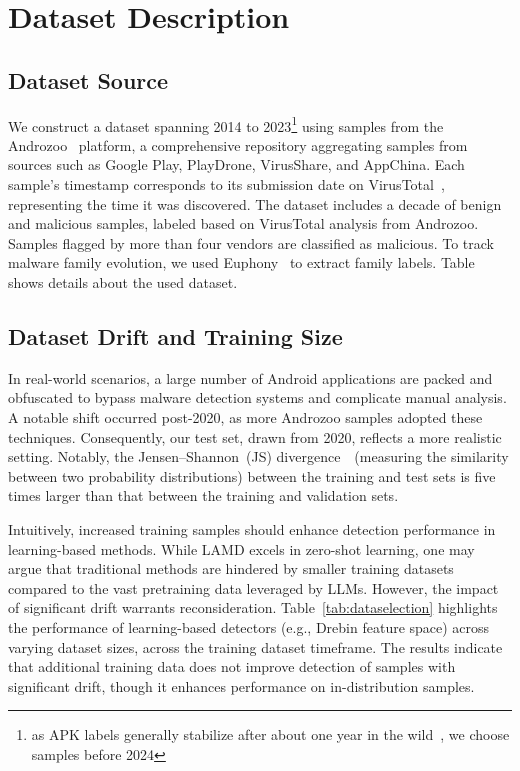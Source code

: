 \section{Dataset Description}
\label{app:dataset}
\subsection{Dataset Source}
\noindent We construct a dataset spanning 2014 to 2023\footnote{as APK labels generally stabilize after about one year in the wild~\cite{labelstability}, we choose samples before 2024} using samples from the Androzoo~\cite{AndroZoo} platform, a comprehensive repository aggregating samples from sources such as Google Play, PlayDrone, VirusShare, and AppChina. Each sample's timestamp corresponds to its submission date on VirusTotal~\cite{VirusTotal}, representing the time it was discovered. The dataset includes a decade of benign and malicious samples, labeled based on VirusTotal analysis from Androzoo. Samples flagged by more than four vendors are classified as malicious. To track malware family evolution, we used Euphony~\cite{euphony} to extract family labels. Table shows details about the used dataset.





\subsection{Dataset Drift and Training Size}
In real-world scenarios, a large number of Android applications are packed and obfuscated to bypass malware detection systems and complicate manual analysis. A notable shift occurred post-2020, as more Androzoo samples adopted these techniques. Consequently, our test set, drawn from 2020, reflects a more realistic setting. 
Notably, the Jensen–Shannon~(JS) divergence~\cite{menendez1997jensen}~(measuring the similarity between two probability distributions) between the training and test sets is five times larger than that between the training and validation sets.

Intuitively, increased training samples should enhance detection performance in learning-based methods. While LAMD excels in zero-shot learning, one may argue that traditional methods are hindered by smaller training datasets compared to the vast pretraining data leveraged by LLMs. However, the impact of significant drift warrants reconsideration. Table~\ref{tab:dataselection} highlights the performance of learning-based detectors (e.g., Drebin feature space) across varying dataset sizes, across the training dataset timeframe.
The results indicate that additional training data does not improve detection of samples with significant drift, though it enhances performance on in-distribution samples. 

